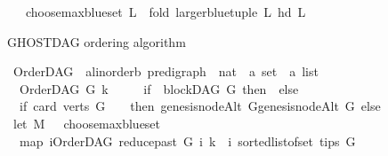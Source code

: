 \begin{isabellebody}
\ \ \ {\isachardoublequoteopen}choose{\isacharunderscore}{\kern0pt}max{\isacharunderscore}{\kern0pt}blue{\isacharunderscore}{\kern0pt}set\ L\ {\isacharequal}{\kern0pt}\ fold\ {\isacharparenleft}{\kern0pt}larger{\isacharunderscore}{\kern0pt}blue{\isacharunderscore}{\kern0pt}tuple{\isacharparenright}{\kern0pt}\ L\ {\isacharparenleft}{\kern0pt}hd\ L{\isacharparenright}{\kern0pt}{\isachardoublequoteclose}%
\begin{isamarkuptext}%
GHOSTDAG ordering algorithm%
\end{isamarkuptext}\isamarkuptrue%
\isamarkupfalse%
\ OrderDAG\ {\isacharcolon}{\kern0pt}{\isacharcolon}{\kern0pt}\ {\isachardoublequoteopen}{\isacharparenleft}{\kern0pt}{\isacharprime}{\kern0pt}a{\isacharcolon}{\kern0pt}{\isacharcolon}{\kern0pt}linorder{\isacharcomma}{\kern0pt}{\isacharprime}{\kern0pt}b{\isacharparenright}{\kern0pt}\ pre{\isacharunderscore}{\kern0pt}digraph\ {\isasymRightarrow}\ nat\ {\isasymRightarrow}\ {\isacharparenleft}{\kern0pt}{\isacharprime}{\kern0pt}a\ set\ {\isasymtimes}\ {\isacharprime}{\kern0pt}a\ list{\isacharparenright}{\kern0pt}{\isachardoublequoteclose}\ \isanewline
\ \ \isanewline
\ \ {\isachardoublequoteopen}OrderDAG\ G\ k\ {\isacharequal}{\kern0pt}\ \ \isanewline
\ \ {\isacharparenleft}{\kern0pt}if\ {\isacharparenleft}{\kern0pt}{\isasymnot}\ blockDAG\ G{\isacharparenright}{\kern0pt}\ then\ {\isacharparenleft}{\kern0pt}{\isacharbraceleft}{\kern0pt}{\isacharbraceright}{\kern0pt}{\isacharcomma}{\kern0pt}{\isacharbrackleft}{\kern0pt}{\isacharbrackright}{\kern0pt}{\isacharparenright}{\kern0pt}\ else\ \isanewline
\ \ if\ {\isacharparenleft}{\kern0pt}card\ {\isacharparenleft}{\kern0pt}verts\ G{\isacharparenright}{\kern0pt}\ {\isacharequal}{\kern0pt}\ {}{\isacharparenright}{\kern0pt}\ \ then\ {\isacharparenleft}{\kern0pt}{\isacharbraceleft}{\kern0pt}genesis{\isacharunderscore}{\kern0pt}nodeAlt\ G{\isacharbraceright}{\kern0pt}{\isacharcomma}{\kern0pt}{\isacharbrackleft}{\kern0pt}genesis{\isacharunderscore}{\kern0pt}nodeAlt\ G{\isacharbrackright}{\kern0pt}{\isacharparenright}{\kern0pt}\ else\isanewline
\ let\ M\ {\isacharequal}{\kern0pt}\ \ choose{\isacharunderscore}{\kern0pt}max{\isacharunderscore}{\kern0pt}blue{\isacharunderscore}{\kern0pt}set\ \isanewline
\ \ {\isacharparenleft}{\kern0pt}{\isacharparenleft}{\kern0pt}map\ {\isacharparenleft}{\kern0pt}{\isasymlambda}i{\isachardot}{\kern0pt}{\isacharparenleft}{\kern0pt}{\isacharparenleft}{\kern0pt}{\isacharparenleft}{\kern0pt}OrderDAG\ {\isacharparenleft}{\kern0pt}reduce{\isacharunderscore}{\kern0pt}past\ G\ i{\isacharparenright}{\kern0pt}\ k{\isacharparenright}{\kern0pt}{\isacharparenright}{\kern0pt}\ {\isacharcomma}{\kern0pt}\ i{\isacharparenright}{\kern0pt}{\isacharparenright}{\kern0pt}\ {\isacharparenleft}{\kern0pt}sorted{\isacharunderscore}{\kern0pt}list{\isacharunderscore}{\kern0pt}of{\isacharunderscore}{\kern0pt}set\ {\isacharparenleft}{\kern0pt}tips\ G{\isacharparenright}{\kern0pt}{\isacharparenright}{\kern0pt}{\isacharparenright}{\kern0pt}{\isacharparenright}{\kern0pt}\isanewline

\end{isabellebody}
